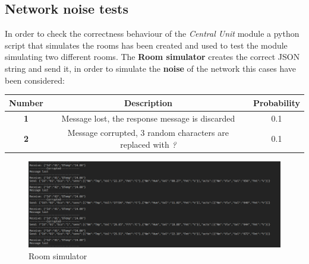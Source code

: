 \subsection{Network noise tests}
In order to check the correctness behaviour of the \textit{Central Unit} module a python script that simulates the rooms has been created and used to test the module simulating two different rooms.
The \textbf{Room simulator} creates the correct JSON string and send it, in order to simulate the \textbf{noise} of the network this cases have been considered:
\begin{center}
	\begin{tabular}{||c | c | c ||} 
		\hline
		Number			& 	Description & Probability\\ 
		\hline
		\textbf{1}		&	Message lost, the response message is discarded & 0.1 \\ 
		\hline
		\textbf{2}		&	Message corrupted, 3 random characters are replaced with \textit{?} & 0.1\\ 
		\hline
	\end{tabular}
\end{center}
\begin{figure}[H]
	\centering
	\includegraphics[width=12cm,keepaspectratio]{img/room_simulator}
	\caption{Room simulator}
	\label{fig:roomsimulator}
\end{figure}